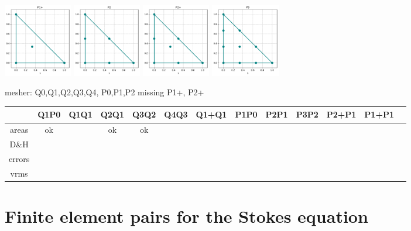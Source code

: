 \begin{center}
\includegraphics[width=3cm]{python_codes/fieldstone_120/spaces/P1+_nodes}
\includegraphics[width=3cm]{python_codes/fieldstone_120/spaces/P2_nodes}
\includegraphics[width=3cm]{python_codes/fieldstone_120/spaces/P2+_nodes}
\includegraphics[width=3cm]{python_codes/fieldstone_120/spaces/P3_nodes}
\end{center}

mesher: Q0,Q1,Q2,Q3,Q4, P0,P1,P2   missing P1+, P2+

\begin{tabular}{ccccccccccccc}
      & Q1P0 & Q1Q1 & Q2Q1 & Q3Q2 & Q4Q3 & Q1+Q1 & P1P0 & P2P1 & P3P2 & P2+P1 & P1+P1 \\
\hline
areas  & ok & & ok & ok &&&&&& \\ 
D\&H   &  \\
errors &  \\
vrms   &  \\
\hline
\end{tabular}


\section*{Finite element pairs for the Stokes equation}


